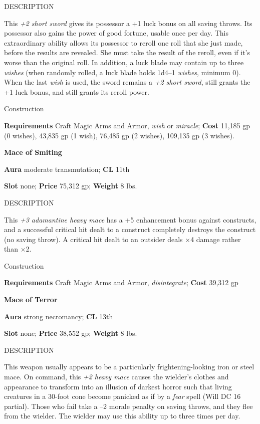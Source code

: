 DESCRIPTION
				
This \textit{+2 short sword} gives its possessor a +1 luck bonus on all saving throws. Its possessor also gains the power of good fortune, usable once per day. This extraordinary ability allows its possessor to reroll one roll that she just made, before the results are revealed. She must take the result of the reroll, even if it's worse than the original roll. In addition, a luck blade may contain up to three \textit{wishes} (when randomly rolled, a luck blade holds 1d4--1 \textit{wishes}, minimum 0). When the last \textit{wish} is used, the sword remains a \textit{+2 short sword}, still grants the +1 luck bonus, and still grants its reroll power. 
				
Construction
				
\textbf{Requirements} Craft Magic Arms and Armor, \textit{wish} or \textit{miracle}; \textbf{Cost }11,185 gp (0 wishes), 43,835 gp (1 wish), 76,485 gp (2 wishes), 109,135 gp (3 wishes).
				
\textbf{Mace of Smiting}
				
\textbf{Aura} moderate transmutation;\textbf{ CL }11th
				
\textbf{Slot} none; \textbf{Price} 75,312 gp; \textbf{Weight} 8 lbs.
				
DESCRIPTION
				
This \textit{+3 adamantine heavy mace} has a +5 enhancement bonus against constructs, and a successful critical hit dealt to a construct completely destroys the construct (no saving throw). A critical hit dealt to an outsider deals \mbox{$\times$}4 damage rather than \mbox{$\times$}2. 
				
Construction
				
\textbf{Requirements} Craft Magic Arms and Armor, \textit{disintegrate}; \textbf{Cost }39,312 gp
				
\textbf{Mace of Terror}
				
\textbf{Aura} strong necromancy;\textbf{ CL }13th
				
\textbf{Slot} none; \textbf{Price} 38,552 gp; \textbf{Weight} 8 lbs.
				
DESCRIPTION
				
This weapon usually appears to be a particularly frightening-looking iron or steel mace. On command, this \textit{+2 heavy mace} causes the wielder's clothes and appearance to transform into an illusion of darkest horror such that living creatures in a 30-foot cone become panicked as if by a \textit{fear} spell (Will DC 16 partial). Those who fail take a --2 morale penalty on saving throws, and they flee from the wielder. The wielder may use this ability up to three times per day. 
				

